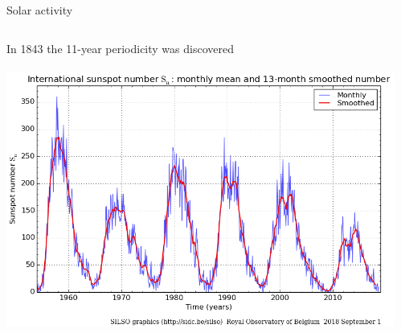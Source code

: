 \begin{frame}[plain,c]{Solar activity}{}
\begin{columns}[c]
		
		In 1843 the 11-year periodicity was discovered\\\ 
		\includegraphics[width=\textwidth]{../figures_of_others/images/ROB_SILSO_SSN_wolfmms_cropped.png}

		\vfill\hfill \hyperlink{butterfly}{\beamerskipbutton{}}
		
	\end{columns}
\end{frame}

